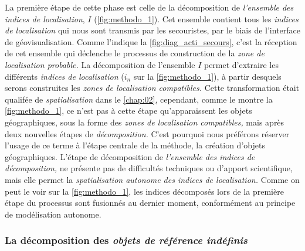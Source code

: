 La première étape de cette phase est celle de la décomposition de
\emph{l'ensemble des indices de localisation}, \(I\)
(\autoref{fig:methodo_1}). Cet ensemble contient tous les
\emph{indices de localisation} qui nous sont transmis par les
secouristes, par le biais de l'interface de géovisualisation. Comme
l'indique la \autoref{fig:diag_acti_secours}, c'est la réception de
cet ensemble qui déclenche le processus de construction de la
\emph{zone de localisation probable.} La décomposition de l'ensemble
\(I\) permet d'extraire les différents \emph{indices de localisation}
(\(i_n\) sur la \autoref{fig:methodo_1}), à partir desquels serons
construites les\emph{ zones de localisation compatibles.} Cette
transformation était qualifée de \emph{spatialisation} dans le
\autoref{chap:02}, cependant, comme le montre la
\autoref{fig:methodo_1}, ce n'est pas à cette étape qu'apparaissent
les objets géographiques, sous la forme des \emph{zones de
  localisation compatibles,} mais après deux nouvelles étapes de
\emph{décomposition.} C'est pourquoi nous préférons réserver l'usage
de ce terme à l'étape centrale de la méthode, la création d'objets
géographiques. L'étape de décomposition de \emph{l'ensemble des
  indices de décomposition,} ne présente pas de difficultés techniques
ou d'apport scientifique, mais elle permet la \emph{spatialisation
  autonome des indices de localisation.} Comme on peut le voir sur la
\autoref{fig:methodo_1}, les indices décomposés lors de la première
étape du processus sont fusionnés au dernier moment, conformément au
principe de modélisation autonome.


\subsubsection{La décomposition des \emph{objets de référence indéfinis}}

